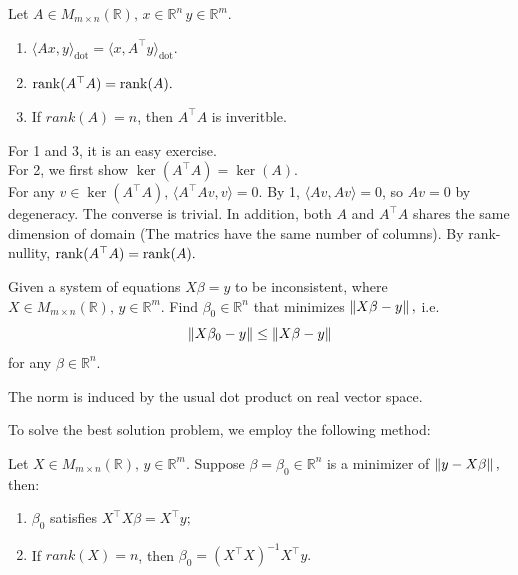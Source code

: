 \begin{theorem} 
    Let $A\in M_{m\times n}(\mathbb{R}),\,x\in\mathbb{R}^n\,y\in\mathbb{R}^m.$
    \begin{enumerate}
        \item $\langle Ax, y\rangle_{\mathrm{dot}} = \langle x, A^\top y\rangle_{\mathrm{dot}}.$
        \item $\operatorname{rank}(A^\top A)=\operatorname{rank}(A).$
        \item If $rank(A)=n$, then $A^\top A$ is inveritble.
    \end{enumerate}
\end{theorem}

\begin{pfbox}
    For 1 and 3, it is an easy exercise.\\
    For 2, we first show $\ker(A^\top A)=\ker(A).$\\
    For any $v\in\ker(A^\top A),\,\langle A^\top Av, v\rangle=0.$ By 1, $\langle Av, Av\rangle=0$, so $Av=0$ by degeneracy. The converse is trivial.
    In addition, both $A$ and $A^\top A$ shares the same dimension of domain (The matrics have the same number of columns). By rank-nullity, $\operatorname{rank}(A^\top A)=\operatorname{rank}(A).$
\end{pfbox}


\begin{question}
    Given a system of equations $X\beta=y$ to be inconsistent, where $X\in M_{m\times n}(\mathbb{R}),\, y\in \mathbb{R}^m$. Find $\beta_0\in\mathbb{R}^n$ that minimizes $\left\lVert X\beta-y \right\rVert,$ i.e.
    $$\left\lVert X\beta_0-y \right\rVert\le\left\lVert X\beta-y \right\rVert$$ 
    for any $\beta\in\mathbb{R}^n.$
\end{question}

\begin{remark}
    The norm is induced by the usual dot product on real vector space.
\end{remark}

To solve the best solution problem, we employ the following method:
\begin{theorem}
    Let $X\in M_{m\times n}(\mathbb{R}),\, y\in\mathbb{R}^m.$ Suppose $\beta=\beta_0\in\mathbb{R}^n$ is a minimizer of $\left\lVert y-X\beta \right\rVert,$ then:
    \begin{enumerate}
        \item $\beta_0$ satisfies $X^\top X\beta=X^\top y;$
        \item If $rank(X)=n$, then $\beta_0=(X^\top X)^{-1}X^\top y.$
    \end{enumerate}
\end{theorem}

